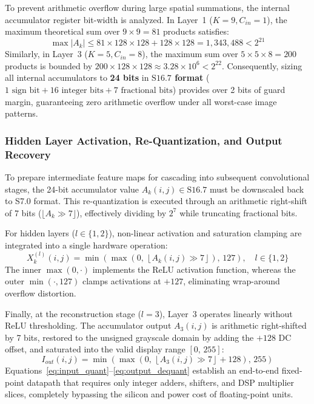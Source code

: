 \documentclass[conference]{IEEEtran}
\begin{document}
To prevent arithmetic overflow during large spatial summations, the internal accumulator register bit-width is analyzed. In Layer~1 ($K = 9, C_{in} = 1$), the maximum theoretical sum over $9 \times 9 = 81$ products satisfies:
\begin{equation}
\max |A_k| \le 81 \times 128 \times 128 + 128 \times 128 = 1,343,488 < 2^{21}
\label{eq:accumulator_bound}
\end{equation}
Similarly, in Layer~3 ($K=5, C_{in}=8$), the maximum sum over $5 \times 5 \times 8 = 200$ products is bounded by $200 \times 128 \times 128 \approx 3.28 \times 10^6 < 2^{22}$. Consequently, sizing all internal accumulators to \textbf{24 bits} in \textbf{$\text{S16.7}$ format} ($1\text{ sign bit} + 16\text{ integer bits} + 7\text{ fractional bits}$) provides over 2 bits of guard margin, guaranteeing zero arithmetic overflow under all worst-case image patterns.

\subsubsection{Hidden Layer Activation, Re-Quantization, and Output Recovery}
To prepare intermediate feature maps for cascading into subsequent convolutional stages, the 24-bit accumulator value $A_k(i, j) \in \text{S16.7}$ must be downscaled back to S7.0 format. This re-quantization is executed through an arithmetic right-shift of 7 bits ($\lfloor A_k \gg 7 \rfloor$), effectively dividing by $2^7$ while truncating fractional bits. 

For hidden layers ($l \in \{1, 2\}$), non-linear activation and saturation clamping are integrated into a single hardware operation:
\begin{equation}
X_k^{(l)}(i, j) = \min\left(\max\left(0,\, \left\lfloor A_k(i, j) \gg 7 \right\rfloor\right),\, 127\right), \quad l \in \{1, 2\}
\label{eq:layer_activation}
\end{equation}
The inner $\max(0, \cdot)$ implements the ReLU activation function, whereas the outer $\min(\cdot, 127)$ clamps activations at $+127$, eliminating wrap-around overflow distortion.

Finally, at the reconstruction stage ($l = 3$), Layer~3 operates linearly without ReLU thresholding. The accumulator output $A_3(i, j)$ is arithmetic right-shifted by 7 bits, restored to the unsigned grayscale domain by adding the $+128$ DC offset, and saturated into the valid display range $[0,\, 255]$:
\begin{equation}
I_{out}(i, j) = \min\left(\max\left(0,\, \left\lfloor A_3(i, j) \gg 7 \right\rfloor + 128\right),\, 255\right)
\label{eq:output_dequant}
\end{equation}
Equations~\eqref{eq:input_quant}--\eqref{eq:output_dequant} establish an end-to-end fixed-point datapath that requires only integer adders, shifters, and DSP multiplier slices, completely bypassing the silicon and power cost of floating-point units.
\end{document}
